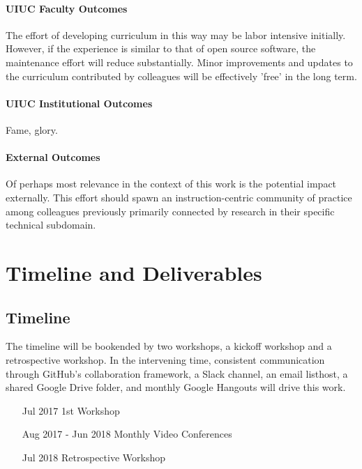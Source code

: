 \documentclass[11pt]{article}
\begin{document}
          \paragraph{UIUC Faculty Outcomes}
          The effort of developing curriculum in this way may be labor 
          intensive initially. However, if the experience is similar to that of 
          open source software, the maintenance effort will reduce 
          substantially. Minor improvements and updates to the curriculum 
          contributed by colleagues will be effectively 'free' in the long 
          term. 

          \paragraph{UIUC Institutional Outcomes}

          Fame, glory.

          \paragraph{External Outcomes}

          Of perhaps most relevance in the context of this work is the 
          potential impact externally. This effort should spawn an 
          instruction-centric community of 
          practice among colleagues previously primarily connected by research 
          in their specific technical subdomain. 

          \section{Timeline and Deliverables}
          \subsection{Timeline}
          The timeline will be bookended by two workshops, a kickoff workshop 
          and a retrospective workshop. In the intervening time, consistent 
          communication through GitHub's collaboration framework, a Slack 
          channel, an email listhost, a shared Google Drive folder, and monthly 
          Google Hangouts will drive this work. 

          \begin{itemize}
                  \item[Jul 2017] 1st Workshop
                  \item[Aug 2017 - Jun 2018] Monthly Video Conferences 
                  \item[Jul 2018] Retrospective Workshop
          \end{itemize}
\end{document}
